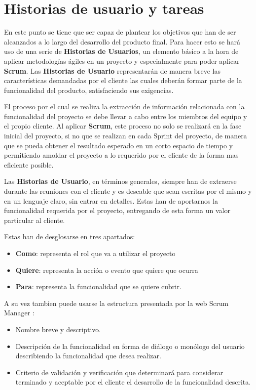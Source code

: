 \section{Historias de usuario y tareas} \label{sec:historias-tareas}

En este punto se tiene que ser capaz de plantear los objetivos que han de ser alcanzados a lo largo del desarrollo del producto final. Para hacer esto se hará uso de una serie de \textbf{Historias de Usuarios}, un elemento básico a la hora de aplicar metodologías ágiles en un proyecto y especialmente para poder aplicar \textbf{Scrum}. Las \textbf{Historias de Usuario} representarán de manera breve las características demandadas por el cliente las cuales deberán formar parte de la funcionalidad del producto, satisfaciendo sus exigencias.

El proceso por el cual se realiza la extracción de información relacionada con la funcionalidad del proyecto se debe llevar a cabo entre los miembros del equipo y el propio cliente. Al aplicar \textbf{Scrum}, este proceso no solo se realizará en la fase inicial del proyecto, si no que se realizan en cada Sprint del proyecto, de manera que se pueda obtener el resultado esperado en un corto espacio de tiempo y permitiendo amoldar el proyecto a lo requerido por el cliente de la forma mas eficiente posible.

Las \textbf{Historias de Usuario}, en términos generales, siempre han de extraerse durante las reuniones con el cliente y es deseable que sean escritas por el mismo y en un lenguaje claro, sin entrar en detalles. Estas han de aportarnos la funcionalidad requerida por el proyecto, entregando de esta forma un valor particular al cliente.

Estas han de desglosarse en tres apartados:

\begin{itemize}
	\item \textbf{Como}: representa el rol que va a utilizar el proyecto
	\item \textbf{Quiere}: representa la acción o evento que quiere que ocurra
	\item \textbf{Para}: representa la funcionalidad que se quiere cubrir.
\end{itemize}

A su vez tambien puede usarse la estructura presentada por la web Scrum Manager \cite{scrum-manager}:

\begin{itemize}
	\item Nombre breve y descriptivo.
	\item Descripción de la funcionalidad en forma de diálogo o monólogo del usuario describiendo la funcionalidad que desea realizar.
	\item Criterio de validación y verificación que determinará para considerar terminado y aceptable por el cliente el desarrollo de la funcionalidad descrita.
\end{itemize}

